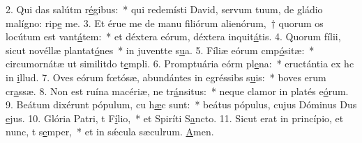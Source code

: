 2. Qui das salútm r\uline{é}gibus:~* qui redemísti David, servum tuum, de gládio malígno: rip\uline{e} me.
3. Et érue me de manu filiórum alienórum,~† quorum os locútum est vant\uline{á}tem:~* et déxtera eórum, déxtera inquit\uline{á}tis.
4. Quorum fílii, sicut novéllæ plantat\uline{ó}nes~* in juventte s\uline{u}a.
5. Fíliæ eórum cmp\uline{ó}sitæ:~* circumornátæ ut similitdo t\uline{e}mpli.
6. Promptuária eórm pl\uline{e}na:~* eructántia ex hc in \uline{i}llud.
7. Oves eórum fœtósæ, abundántes in egréssibs s\uline{u}is:~* boves erum cr\uline{a}ssæ.
8. Non est ruína macériæ, ne tr\uline{á}nsitus:~* neque clamor in platés e\uline{ó}rum.
9. Beátum dixérunt pópulum, cu h\uline{æ}c sunt:~* beátus pópulus, cujus Dóminus Dus \uline{e}jus.
10. Glória Patri, t F\uline{í}lio,~* et Spiríti S\uline{a}ncto.
11. Sicut erat in princípio, et nunc, t s\uline{e}mper,~* et in sǽcula sæculrum. \uline{A}men.
